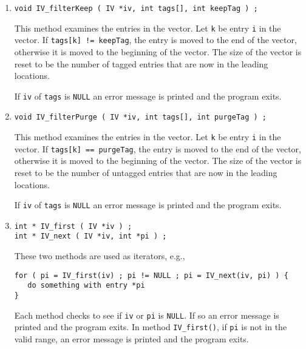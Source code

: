 \begin{enumerate}
\item
\begin{verbatim}
void IV_filterKeep ( IV *iv, int tags[], int keepTag ) ;
\end{verbatim}
This method examines the entries in the vector.
Let {\tt k} be entry {\tt i} in the vector.
If {\tt tags[k] != keepTag}, the entry is moved to the end of the
vector, otherwise it is moved to the beginning of the vector.
The size of the vector is reset to be the number of tagged entries
that are now in the leading locations.
\par {}
If {\tt iv} of {\tt tags} is {\tt NULL}
an error message is printed and the program exits.
\item
\begin{verbatim}
void IV_filterPurge ( IV *iv, int tags[], int purgeTag ) ;
\end{verbatim}
This method examines the entries in the vector.
Let {\tt k} be entry {\tt i} in the vector.
If {\tt tags[k] == purgeTag}, the entry is moved to the end of the
vector, otherwise it is moved to the beginning of the vector.
The size of the vector is reset to be the number of untagged entries
that are now in the leading locations.
\par {}
If {\tt iv} of {\tt tags} is {\tt NULL}
an error message is printed and the program exits.
\item
\begin{verbatim}
int * IV_first ( IV *iv ) ;
int * IV_next ( IV *iv, int *pi ) ;
\end{verbatim}
These two methods are used as iterators, e.g.,
\begin{verbatim}
for ( pi = IV_first(iv) ; pi != NULL ; pi = IV_next(iv, pi) ) {
   do something with entry *pi
}
\end{verbatim}
\par {}
Each method checks to see if {\tt iv} or {\tt pi} is {\tt NULL}.
If so an error message is printed and the program exits.
In method {\tt IV\_first()}, if {\tt pi} is not in the valid
range, an error message is printed and the program exits.

\end{enumerate}
